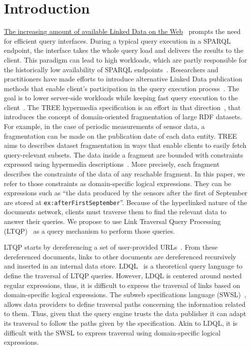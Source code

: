 \section{Introduction}



\href{https://lod-cloud.net/#diagram}{The increasing amount of available Linked Data on the Web}~\cite{Ermilov2013} prompts the need for efficient query interfaces.
During a typical query execution in a SPARQL endpoint, the interface takes the whole query load and delivers the results to the client.
This paradigm can lead to high workloads, which are partly responsible for the historically low availability of SPARQL endpoints~\cite{aranda2013}.
Researchers and practitioners have made efforts to introduce alternative Linked Data publication methods that enable client's participation in the query execution process~\cite{Verborgh2016TriplePF}.
The goal is to lower server-side workloads while keeping fast query execution to the client~\cite{Azzam2021}.
The TREE hypermedia specification is an effort in that direction~\cite{ColpaertMaterializedTREE, lancker2021LDS}, that introduces the concept of domain-oriented fragmentation of large RDF datasets.
For example, in the case of periodic measurements of sensor data, a fragmentation can be made on the publication date of each data entity.
TREE aims to describes dataset fragmentation in ways that enable clients to easily fetch query-relevant subsets.
The data inside a fragment are bounded with constraints expressed using hypermedia descriptions~\cite{thomasFieldingPhdThesis}.
More precisely, each fragment describes the constraints of the data of any reachable fragment.
In this paper, we refer to those constraints as domain-specific logical expressions.
They can be expressions such as ``the data produced by the sensors after the first of September are stored at \texttt{ex:afterFirstSeptember}''.
Because of the hyperlinked nature of the documents network, clients must traverse them to find the relevant data to answer their queries.
We propose to use Link Traversal Query Processing (LTQP)~\cite{Hartig2016} as a query mechanism to perform those queries.

LTQP starts by dereferencing a set of user-provided URLs~\cite{Hartig2016}.
From these dereferenced documents, links to other documents are dereferenced recursively and inserted in an internal data store.
LDQL~\cite{hartig2016Ldql} is a theoretical query language to define the traversal of LTQP queries.
However, LDQL is centered around nested regular expressions, thus, it is difficult to express the traversal of links based on domain-specific logical expressions.
The subweb specifications language (SWSL)~\cite{bogaerts_rulemlrr_2021}, allows data providers to define traversal paths concerning the information related to them.
Thus, given that the query engine trusts the data publisher it can adapt its traversal to follow the paths given by the specification.
Akin to LDQL, it is difficult with the SWSL to express traversal using domain-specific logical expressions.

